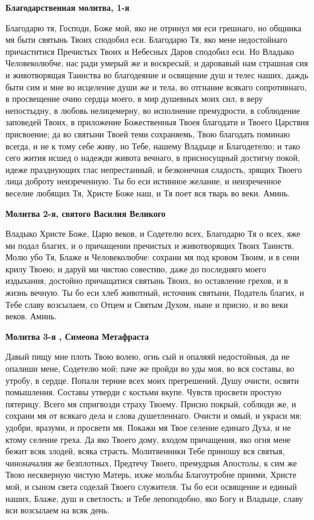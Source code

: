 \bfseries Благодарственная молитва, 1-я\normalfont{}


Благодарю тя, Господи, Боже мой, яко не отринул мя еси грешнаго, но общника мя быти святынь Твоих сподобил еси. Благодарю Тя, яко мене недостойнаго причаститися Пречистых Твоих и Небесных Даров сподобил еси. Но Владыко Человеколюбче, нас ради умерый же и воскресый, и даровавый нам страшная сия и животворящая Таинства во благодеяние и освящение душ и телес наших, даждь быти сим и мне во исцеление души же и тела, во отгнание всякаго сопротивнаго, в просвещение очию сердца моего, в мир душевных моих сил, в веру непостыдну, в любовь нелицемерну, во исполнение премудрости, в соблюдение заповедей Твоих, в приложение Божественныя Твоея благодати и Твоего Царствия присвоение; да во святыни Твоей теми сохраняемь, Твою благодать поминаю всегда, и не к тому себе живу, но Тебе, нашему Владыце и Благодетелю; и тако сего жития исшед о надежди живота вечнаго, в присносущный достигну покой, идеже празднующих глас непрестанный, и безконечная сладость, зрящих Твоего лица доброту неизреченную. Ты бо еси истинное желание, и неизреченное веселие любящих Тя, Христе Боже наш, и Тя поет вся тварь во веки. Аминь.




\bfseries Молитва 2-я, святого Василия Великого\normalfont{}


Владыко Христе Боже, Царю веков, и Содетелю всех, Благодарю Тя о всех, яже ми подал благих, и о причащении пречистых и животворящих Твоих Таинств. Молю убо Тя, Блаже и Человеколюбче: сохрани мя под кровом Твоим, и в сени крилу Твоею; и даруй ми чистою совестию, даже до последняго моего издыхания, достойно причащатися святынь Твоих, во оставление грехов, и в жизнь вечную. Ты бо еси хлеб животный, источник святыни, Податель благих, и Тебе славу возсылаем, со Отцем и Святым Духом, ныне и присно, и во веки веков. Аминь.




\bfseries Молитва 3-я , Симеона Метафраста\normalfont{}


Давый пищу мне плоть Твою волею, огнь сый и опаляяй недостойныя, да не опалиши мене, Содетелю мой; паче же пройди во уды моя, во вся составы, во утробу, в сердце. Попали терние всех моих прегрешений. Душу очисти, освяти помышления. Составы утверди с костьми вкупе. Чувств просвети простую пятерицу. Всего мя спригвозди страху Твоему. Присно покрый, соблюди же, и сохрани мя от всякаго дела и слова душетленнаго. Очисти и омый, и украси мя; удобри, вразуми, и просвети мя. Покажи мя Твое селение единаго Духа, и не ктому селение греха. Да яко Твоего дому, входом причащения, яко огня мене бежит всяк злодей, всяка страсть. Молитвенники Тебе приношу вся святыя, чиноначалия же безплотных, Предтечу Твоего, премудрыя Апостолы, к сим же Твою нескверную чистую Матерь, ихже мольбы Благоутробне приими, Христе мой, и сыном света соделай Твоего служителя. Ты бо еси освящение и единый наших, Блаже, душ и светлость; и Тебе лепоподобно, яко Богу и Владыце, славу вси возсылаем на всяк день.




